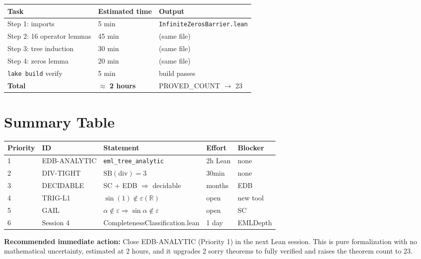 \documentclass[12pt]{article}
\theoremstyle{definition}
\begin{document}
\begin{center}
\begin{tabular}{lll}
\toprule
Task & Estimated time & Output \\
\midrule
Step 1: imports & 5 min & \texttt{InfiniteZerosBarrier.lean} \\
Step 2: 16 operator lemmas & 45 min & (same file) \\
Step 3: tree induction & 30 min & (same file) \\
Step 4: zeros lemma & 20 min & (same file) \\
\texttt{lake build} verify & 5 min & build passes \\
\midrule
\textbf{Total} & $\approx$ \textbf{2 hours} & PROVED\_COUNT $\to$ 23 \\
\bottomrule
\end{tabular}
\end{center}

\section{Summary Table}

\begin{center}
\begin{tabular}{lllll}
\toprule
Priority & ID & Statement & Effort & Blocker \\
\midrule
1 & EDB-ANALYTIC & \texttt{eml\_tree\_analytic} & 2h Lean & none \\
2 & DIV-TIGHT & $\mathrm{SB}(\mathrm{div}) = 3$ & 30min & none \\
3 & DECIDABLE & SC + EDB $\Rightarrow$ decidable & months & EDB \\
4 & TRIG-L1 & $\sin(1) \notin \varepsilon(\mathbb{R})$ & open & new tool \\
5 & GAIL & $\alpha\notin\varepsilon \Rightarrow \sin\alpha\notin\varepsilon$ & open & SC \\
6 & Session 4 & CompletenessClassification.lean & 1 day & EMLDepth \\
\bottomrule
\end{tabular}
\end{center}

\textbf{Recommended immediate action:} Close EDB-ANALYTIC (Priority 1) in the
next Lean session.  This is pure formalization with no mathematical uncertainty,
estimated at 2 hours, and it upgrades 2 sorry theorems to fully verified and
raises the theorem count to 23.
\end{document}
